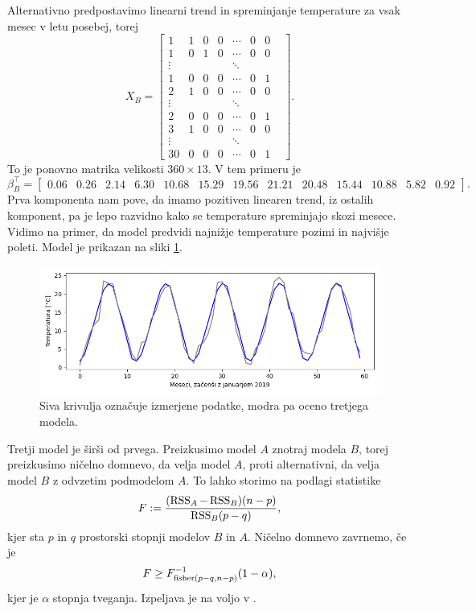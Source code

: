 \documentclass[12pt, a4paper]{article}
\begin{document}
Alternativno predpostavimo linearni trend in spreminjanje temperature za vsak mesec
v letu posebej, torej
\[
    X_B = \begin{bmatrix}
        1 & 1 & 0 & 0 & \cdots & 0 & 0 \\
        1 & 0 & 1 & 0 & \cdots & 0 & 0 \\
        \vdots & & & & \ddots & & & \\
        1 & 0 & 0 & 0 & \cdots & 0 & 1 \\
        2 & 1 & 0 & 0 & \cdots & 0 & 0 \\
        \vdots & & & & \ddots & & & \\
        2 & 0 & 0 & 0 & \cdots & 0 & 1 \\
        3 & 1 & 0 & 0 & \cdots & 0 & 0 \\
        \vdots & & & & \ddots & & & \\
        30 & 0 & 0 & 0 & \cdots & 0 & 1 
    \end{bmatrix}.
\]
To je ponovno matrika velikosti $360 \times 13$. V tem primeru je
\footnotesize
\setcounter{MaxMatrixCols}{20}
\[
    \beta_B^\top = \begin{bmatrix}
        0.06 & 0.26 & 2.14 & 6.30 & 10.68 & 15.29 & 
        19.56 & 21.21 & 20.48 & 15.44 & 10.88 & 5.82 & 0.92
    \end{bmatrix}.
\]
\normalsize
Prva komponenta nam pove, da imamo pozitiven linearen trend, 
iz ostalih komponent, pa je lepo razvidno kako se temperature
spreminjajo skozi mesece. Vidimo na primer, da model 
predvidi najnižje temperature pozimi in najvišje poleti.
Model je prikazan na sliki \ref{png:drugi}.
\begin{figure}[H]
    \centering
    \includegraphics[width=14cm]{Slike/drugi_model.png}
    \caption{Siva krivulja označuje izmerjene podatke, modra pa oceno 
    tretjega modela.}
    \label{png:drugi}
\end{figure}
Tretji model je širši od prvega. Preizkusimo model $A$ znotraj 
modela $B$, torej preizkusimo ničelno domnevo, da velja model $A$, 
proti alternativni, da velja model $B$ z odvzetim podmodelom $A$.
To lahko storimo na podlagi statistike
\[
    F := \frac{(\operatorname{RSS}_A - \operatorname{RSS}_B)(n-p)}{\operatorname{RSS}_B (p-q)},
\]
kjer sta $p$ in $q$ prostorski stopnji modelov $B$ in $A$. 
Ničelno domnevo zavrnemo, če je 
\[
    F \ge F^{-1}_{\operatorname{fisher}(p-q,n-p)}(1-\alpha),
\]
kjer je $\alpha$ stopnja tveganja. 
Izpeljava je na voljo v \cite{raic2}. 
\end{document}
